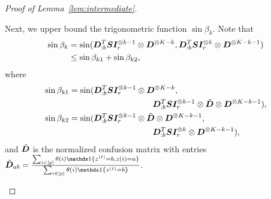 \documentclass[journal]{IEEEtran}
\theoremstyle{definition}
\theoremstyle{definition}
\begin{document}
\begin{proof}[Proof of Lemma~\ref{lem:intermediate}]
\begin{enumerate}[wide]
    Next, we upper bound the trigonometric function $\sin \beta_k$. Note that
    \begin{align}
         \sin \beta_k &= \sin ({\bm{D}_{:b}^{T} \bm S \bm I_r^{\otimes k-1} \otimes \bm{D}^{\otimes K-k} }, {\bm{D}_{:b}^{T} \bm S \bm I_r^{\otimes k} \otimes \bm{D}^{\otimes K-k-1} } )\\
         &\leq \sin \beta_{k1} + \sin \beta_{k2},
    \end{align}
    where
    \begin{align}
         \sin \beta_{k1} &= \sin ({\bm{D}_{:b}^{T} \bm S \bm I_r^{\otimes k-1} \otimes \bm{D}^{\otimes K-k} }, \\
         & \quad \quad \quad \quad \quad \quad\quad \quad\quad \quad {\bm{D}_{:b}^{T} \bm S\bm I_r^{\otimes k-1} \otimes \tilde {\bm{D}}\otimes \bm{D}^{\otimes K-k-1} } ),\\
         \sin \beta_{k2} & = \sin ({\bm{D}_{:b}^{T} \bm S \bm I_r^{\otimes k-1} \otimes \tilde {\bm{D}} \otimes \bm{D}^{\otimes K-k-1} } ,\\
         &\quad \quad \quad \quad \quad \quad\quad \quad\quad \quad  {\bm{D}_{:b}^{T} \bm S\bm I_r^{\otimes k} \otimes \bm{D}^{\otimes K-k-1} }   ),
    \end{align}
    and $\tilde {\bm{D}}$ is the normalized confusion matrix with entries $\tilde \mD_{ab} = \frac{\sum_{i \in [p]} \theta(i) \ind\{z^{(t)} = b, z(i) = a\}}{\sum_{i \in [p] }\theta(i) \ind\{z^{(t)} = b\}}$.
    
    

\end{enumerate}
\end{proof}
\end{document}
